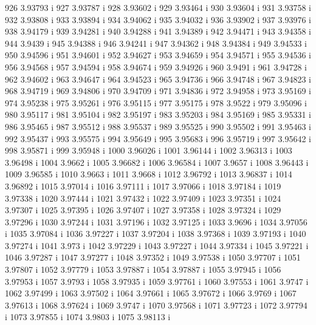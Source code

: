  926  3.93793  i
 927  3.93787  i
 928  3.93602  i
 929  3.93464  i
 930  3.93604  i
 931  3.93758  i
 932  3.93808  i
 933  3.93894  i
 934  3.94062  i
 935  3.94032  i
 936  3.93902  i
 937  3.93976  i
 938  3.94179  i
 939  3.94281  i
 940  3.94288  i
 941  3.94389  i
 942  3.94471  i
 943  3.94358  i
 944  3.9439  i
 945  3.94388  i
 946  3.94241  i
 947  3.94362  i
 948  3.94384  i
 949  3.94533  i
 950  3.94596  i
 951  3.94601  i
 952  3.94627  i
 953  3.94659  i
 954  3.94571  i
 955  3.94536  i
 956  3.94568  i
 957  3.94594  i
 958  3.94674  i
 959  3.94926  i
 960  3.9491  i
 961  3.94728  i
 962  3.94602  i
 963  3.94647  i
 964  3.94523  i
 965  3.94736  i
 966  3.94748  i
 967  3.94823  i
 968  3.94719  i
 969  3.94806  i
 970  3.94709  i
 971  3.94836  i
 972  3.94958  i
 973  3.95169  i
 974  3.95238  i
 975  3.95261  i
 976  3.95115  i
 977  3.95175  i
 978  3.9522  i
 979  3.95096  i
 980  3.95117  i
 981  3.95104  i
 982  3.95197  i
 983  3.95203  i
 984  3.95169  i
 985  3.95331  i
 986  3.95465  i
 987  3.95512  i
 988  3.95537  i
 989  3.95525  i
 990  3.95502  i
 991  3.95463  i
 992  3.95437  i
 993  3.95575  i
 994  3.95649  i
 995  3.95683  i
 996  3.95719  i
 997  3.95642  i
 998  3.95871  i
 999  3.95948  i
 1000  3.96026  i
 1001  3.96144  i
 1002  3.96313  i
 1003  3.96498  i
 1004  3.9662  i
 1005  3.96682  i
 1006  3.96584  i
 1007  3.9657  i
 1008  3.96443  i
 1009  3.96585  i
 1010  3.9663  i
 1011  3.9668  i
 1012  3.96792  i
 1013  3.96837  i
 1014  3.96892  i
 1015  3.97014  i
 1016  3.97111  i
 1017  3.97066  i
 1018  3.97184  i
 1019  3.97338  i
 1020  3.97444  i
 1021  3.97432  i
 1022  3.97409  i
 1023  3.97351  i
 1024  3.97307  i
 1025  3.97395  i
 1026  3.97407  i
 1027  3.97358  i
 1028  3.97324  i
 1029  3.97296  i
 1030  3.97244  i
 1031  3.97196  i
 1032  3.97125  i
 1033  3.9696  i
 1034  3.97056  i
 1035  3.97084  i
 1036  3.97227  i
 1037  3.97204  i
 1038  3.97368  i
 1039  3.97193  i
 1040  3.97274  i
 1041  3.973  i
 1042  3.97229  i
 1043  3.97227  i
 1044  3.97334  i
 1045  3.97221  i
 1046  3.97287  i
 1047  3.97277  i
 1048  3.97352  i
 1049  3.97538  i
 1050  3.97707  i
 1051  3.97807  i
 1052  3.97779  i
 1053  3.97887  i
 1054  3.97887  i
 1055  3.97945  i
 1056  3.97953  i
 1057  3.9793  i
 1058  3.97935  i
 1059  3.97761  i
 1060  3.97553  i
 1061  3.9747  i
 1062  3.97499  i
 1063  3.97502  i
 1064  3.97661  i
 1065  3.97672  i
 1066  3.9769  i
 1067  3.97613  i
 1068  3.97624  i
 1069  3.9747  i
 1070  3.97568  i
 1071  3.97723  i
 1072  3.97794  i
 1073  3.97855  i
 1074  3.9803  i
 1075  3.98113  i
